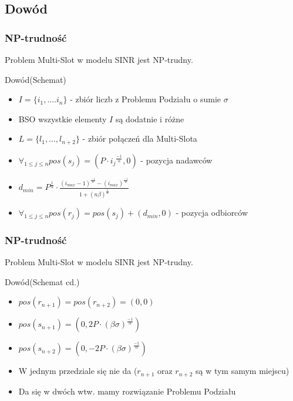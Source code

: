 \documentclass[polish, t,10pt]{beamer}
\begin{document}
\subsection{Dowód}
\begin{frame}
    \frametitle{NP-trudność}
    \begin{theorem}
        Problem Multi-Slot w modelu SINR jest NP-trudny.
    \end{theorem}
    \begin{block}{Dowód(Schemat)}
        \begin{itemize}
            \item $I = \{i_1, \ldots. i_n\}$ - zbiór liczb z Problemu Podziału o sumie $\sigma$
            \item BSO wszystkie elementy $I$ są dodatnie i różne %
            \item $L = \{l_1, \ldots, l_{n+2}\}$ - zbiór połączeń dla Multi-Slota
            \item $\forall_{1 \leq j \leq n} pos(s_j) = (P\cdot{i_j}^\frac{-1}{\alpha}, 0)$ - pozycja nadawców
            \item $d_{min} = P^\frac{1}{\alpha}\cdot\frac{(i_{max}-1)^\frac{-1}{\alpha}-(i_{max})^\frac{-1}{\alpha}}{1+(n\beta)^\frac{1}{\alpha}}$
            \item $\forall_{1 \leq j \leq n} pos(r_j) = pos(s_j) + (d_{min}, 0)$ - pozycja odbiorców
        \end{itemize}
    \end{block}
\end{frame}
\begin{frame}
    \frametitle{NP-trudność}
    \begin{theorem}
        Problem Multi-Slot w modelu SINR jest NP-trudny.
    \end{theorem}
    \begin{block}{Dowód(Schemat cd.)}
        \begin{itemize}
            \item $pos(r_{n+1}) = pos(r_{n+2}) = (0, 0)$
            \item $pos(s_{n+1}) = (0, 2P\cdot(\beta\sigma)^{\frac{-1}{\alpha}})$
            \item $pos(s_{n+2}) = (0, -2P\cdot(\beta\sigma)^{\frac{-1}{\alpha}})$
            \item W jednym przedziale się nie da ($r_{n+1}$ oraz $r_{n+2}$ są w tym samym miejscu)
            \item Da się w dwóch wtw. mamy rozwiązanie Problemu Podziału
        \end{itemize}
    \end{block}
\end{frame}
\end{document}

